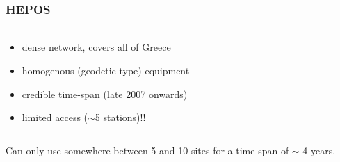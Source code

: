 \documentclass{beamer}
\begin{document}
\begin{frame}\frametitle{HEPOS}\framesubtitle{}
\begin{columns}[T] %
\begin{column}{.40\textwidth}
  \begin{itemize}
    \item<pro@1-> dense network, covers all of Greece
    \item<pro@1-> homogenous (geodetic type) equipment
    \item<con@1-> credible time-span (late 2007 onwards)
    \item<con@1-> limited access ($\sim$5 stations)!!
  \end{itemize}
\end{column}%
\hfill%
%
\end{columns}
  \begin{block}{}
  Can only use somewhere between 5 and 10 sites for a time-span of $\sim$ 4 years.
  \end{block}
\end{frame}
\end{document}
